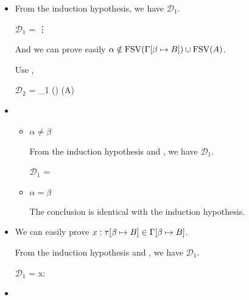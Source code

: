 \begin{itemize}
	      	      	      
	\item \KGen
	      	      	      
	      From the induction hypothesis, we have $\mathcal{D}_1$.
	      	      	      
	      $\mathcal{D}_1$ = 
	      {\vdots}
	      	      	      
	      And we can prove easily $\alpha \notin \text{FSV}(\Gamma[\beta \mapsto B]) \cup \text{FSV}(A)$.
	      	      	      
	      Use \KGen,
	      	      	      
	      $\mathcal{D}_2$ = 
	      {_1 \andalso \alpha \notin \FTV(\GG) \cup \FTV(A)}
	      	      	      
	\item \KCsp
	      	      	      
	      \begin{itemize}
	      		      		      	
	      	\item $\alpha \neq \beta$
	      	      	      	      
	      	      From the induction hypothesis and \KCsp, we have $\mathcal{D}_1$.
	      	      	      	      
	      	      $\mathcal{D}_1$ = 
	      	      {}
	      	      	      	      
	      	\item $\alpha = \beta$
	      	      	      	      
	      	      The conclusion is identical with the induction hypothesis.
	      	      	      	      
	      \end{itemize}
	      	      
	\item \TVar
	      	      
	      We can easily prove $x:\tau[\beta \mapsto B] \in \Gamma[\beta \mapsto B]$.
	      	      
	      From the induction hypothesis and \TVar, we have $\mathcal{D}_1$.
	      	      
	      $\mathcal{D}_1$ = 
	      {x:\tau\SB \in \GG \andalso {}}
	      	      
	\item \TAbs
	      	      

\end{itemize}
